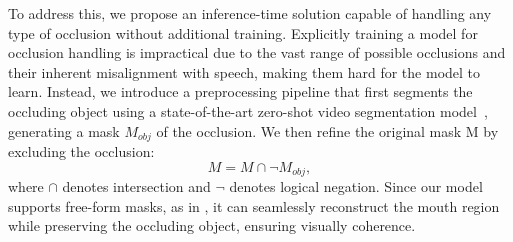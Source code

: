 To address this, we propose an inference-time solution capable of handling any type of occlusion without additional training. Explicitly training a model for occlusion handling is impractical due to the vast range of possible occlusions and their inherent misalignment with speech, making them hard for the model to learn. Instead, we introduce a preprocessing pipeline that first segments the occluding object using a state-of-the-art zero-shot video segmentation model~\cite{sam2}, generating a mask  $M_{obj}$  of the occlusion. We then refine the original mask  M  by excluding the occlusion:
\begin{equation}
M = M \cap \neg M_{obj},
\end{equation} where $\cap$ denotes intersection and $\neg$ denotes logical negation. Since our model supports free-form masks, as in \cite{repaint}, it can seamlessly reconstruct the mouth region while preserving the occluding object, ensuring visually coherence.
